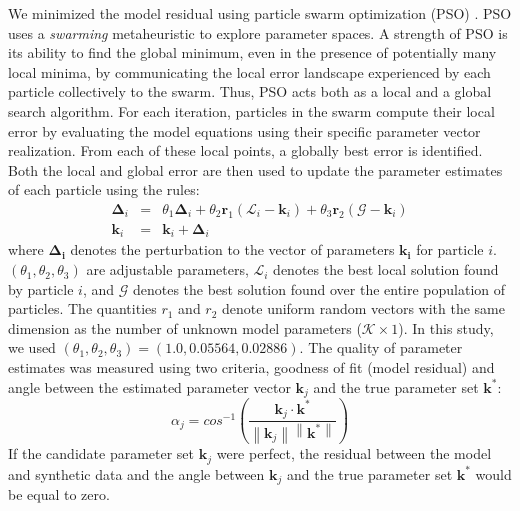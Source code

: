 \documentclass[12pt]{article}
\newcommand{\norm}[1]{\left\lVert#1\right\rVert}
\begin{document}
We minimized the model residual using particle swarm optimization (PSO) \citep{PSO}.
PSO uses a \textit{swarming} metaheuristic to explore parameter spaces. 
A strength of PSO is its ability to find the global minimum, even in the presence of potentially many local minima, by communicating the local
error landscape experienced by each particle collectively to the swarm. Thus, PSO acts both as a local and a global search algorithm. 
For each iteration, particles in the swarm compute their local error by evaluating the model equations using their specific parameter vector realization.
From each of these local points, a globally best error is identified. Both the local and global error 
are then used to update the parameter estimates of each particle using the rules:
\begin{eqnarray}
	\mathbf{\Delta}_{i} &=&\theta_{1}\mathbf{\Delta}_{i} + \theta_{2}\mathbf{r}_{1}\left(\mathcal{L}_{i} - \mathbf{k}_{i}\right) + \theta_{3}\mathbf{r}_{2}\left(\mathcal{G} - \mathbf{k}_{i}\right) \\
	\mathbf{k}_{i} &=& \mathbf{k}_{i} + \mathbf{\Delta}_{i}
\end{eqnarray}
where $\mathbf{\Delta_i}$ denotes the perturbation to the vector of parameters $\mathbf{k_i}$ for particle $i$. 
$\left(\theta_{1},\theta_{2},\theta_{3}\right)$ are adjustable parameters, $\mathcal{L}_{i}$ denotes the best local solution found by particle $i$, and
$\mathcal{G}$ denotes the best solution found over the entire population of particles. The quantities $r_{1}$ and $r_{2}$ denote uniform random vectors with the same dimension as the number of unknown model
parameters ($\mathcal{K}\times{1}$). In this study, we used $\left(\theta_{1},\theta_{2},\theta_{3}\right) = \left(1.0, 0.05564, 0.02886\right)$. The quality of parameter
estimates was measured using two criteria, goodness of fit (model residual) and angle between the estimated parameter vector $\mathbf{k}_{j}$ and the true parameter set $\mathbf{k}^{*}$:
\begin{equation}
	\alpha_{j} = cos^{-1}\left(\frac{\mathbf{k}_{j}\cdot{\mathbf{k^{*}}}}{\norm{\mathbf{k}_{j}}\norm{\mathbf{k^{*}}}}\right)
\end{equation}If the candidate parameter set $\mathbf{k}_{j}$ were perfect, the residual between the model and synthetic data 
and the angle between $\mathbf{k}_{j}$ and the true parameter set $\mathbf{k}^{*}$ would be equal to zero.
\end{document}
